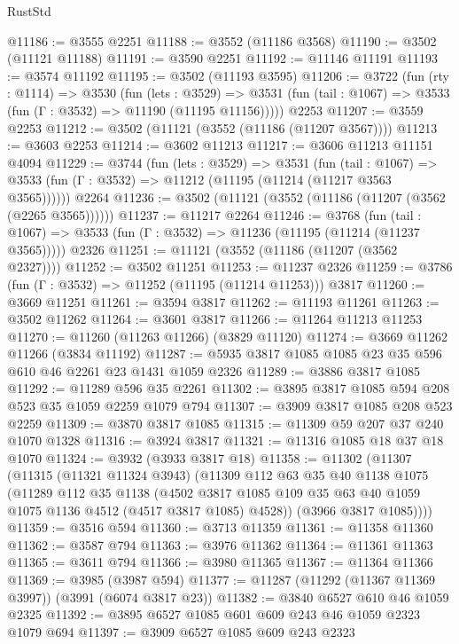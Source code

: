 \begin{lexlean}{RustStd}
\begin{coremodule}
@11186 := @3555 @2251
@11188 := @3552 (@11186 @3568)
@11190 := @3502 (@11121 @11188)
@11191 := @3590 @2251
@11192 := @11146 @11191
@11193 := @3574 @11192
@11195 := @3502 (@11193 @3595)
@11206 := @3722
    (fun (rty : @1114) =>
    @3530
      (fun (lets : @3529) =>
      @3531 (fun (tail : @1067) => @3533 (fun (Γ : @3532) => @11190 (@11195 @11156)))))
    @2253
@11207 := @3559 @2253
@11212 := @3502 (@11121 (@3552 (@11186 (@11207 @3567))))
@11213 := @3603 @2253
@11214 := @3602 @11213
@11217 := @3606 @11213 @11151 @4094
@11229 := @3744
    (fun (lets : @3529) =>
    @3531
      (fun (tail : @1067) =>
      @3533 (fun (Γ : @3532) => @11212 (@11195 (@11214 (@11217 @3563 @3565))))))
    @2264
@11236 := @3502 (@11121 (@3552 (@11186 (@11207 (@3562 (@2265 @3565))))))
@11237 := @11217 @2264
@11246 := @3768
    (fun (tail : @1067) => @3533 (fun (Γ : @3532) => @11236 (@11195 (@11214 (@11237 @3565)))))
    @2326
@11251 := @11121 (@3552 (@11186 (@11207 (@3562 @2327))))
@11252 := @3502 @11251
@11253 := @11237 @2326
@11259 := @3786 (fun (Γ : @3532) => @11252 (@11195 (@11214 @11253))) @3817
@11260 := @3669 @11251
@11261 := @3594 @3817
@11262 := @11193 @11261
@11263 := @3502 @11262
@11264 := @3601 @3817
@11266 := @11264 @11213 @11253
@11270 := @11260 (@11263 @11266) (@3829 @11120)
@11274 := @3669 @11262 @11266 (@3834 @11192)
@11287 := @5935 @3817 @1085 @1085 @23 @35 @596 @610 @46 @2261 @23 @1431 @1059 @2326
@11289 := @3886 @3817 @1085
@11292 := @11289 @596 @35 @2261
@11302 := @3895 @3817 @1085 @594 @208 @523 @35 @1059 @2259 @1079 @794
@11307 := @3909 @3817 @1085 @208 @523 @2259
@11309 := @3870 @3817 @1085
@11315 := @11309 @59 @207 @37 @240 @1070 @1328
@11316 := @3924 @3817
@11321 := @11316 @1085 @18 @37 @18 @1070
@11324 := @3932 (@3933 @3817 @18)
@11358 := @11302
    (@11307
      (@11315
        (@11321 @11324 @3943)
        (@11309
          @112
          @63
          @35
          @40
          @1138
          @1075
          (@11289
            @112
            @35
            @1138
            (@4502 @3817 @1085 @109 @35 @63 @40 @1059 @1075 @1136 @4512 (@4517 @3817 @1085) @4528))
          (@3966 @3817 @1085))))
@11359 := @3516 @594
@11360 := @3713 @11359
@11361 := @11358 @11360
@11362 := @3587 @794
@11363 := @3976 @11362
@11364 := @11361 @11363
@11365 := @3611 @794
@11366 := @3980 @11365
@11367 := @11364 @11366
@11369 := @3985 (@3987 @594)
@11377 := @11287 (@11292 (@11367 @11369 @3997)) (@3991 (@6074 @3817 @23))
@11382 := @3840 @6527 @610 @46 @1059 @2325
@11392 := @3895 @6527 @1085 @601 @609 @243 @46 @1059 @2323 @1079 @694
@11397 := @3909 @6527 @1085 @609 @243 @2323

\end{coremodule}
\end{lexlean}
